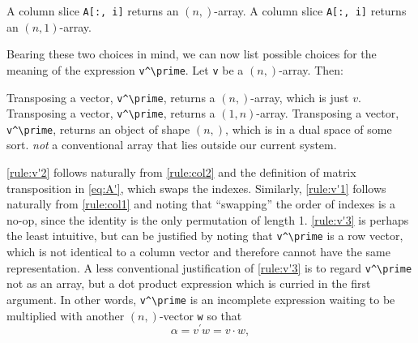 A column slice \lstinline|A[:, i]| returns an $(n,)$-array.\label{rule:col1}
A column slice \lstinline|A[:, i]| returns an $(n,1)$-array.\label{rule:col2}

Bearing these two choices in mind, we can now list possible choices for the
meaning of the expression \lstinline|v^\prime|. Let \lstinline|v| be a $(n,)$-array. Then:

Transposing a vector, \lstinline|v^\prime|, returns a $(n,)$-array, which is just
      $v$.\label{rule:v'1}
Transposing a vector, \lstinline|v^\prime|, returns a $(1,n)$-array.\label{rule:v'2}
Transposing a vector, \lstinline|v^\prime|, returns an object of shape $(n,)$,
      which is in a dual space of some sort. \textit{not} a conventional array
      that lies outside our current system.\label{rule:v'3}
%

\ref{rule:v'2} follows naturally from \ref{rule:col2} and the definition of
matrix transposition in \eqref{eq:A'}, which swaps the indexes. Similarly,
\ref{rule:v'1} follows naturally from \ref{rule:col1} and noting that
``swapping'' the order of indexes is a no-op, since the identity is the only
permutation of length 1. \ref{rule:v'3} is perhaps the least intuitive, but
can be justified by noting that \lstinline|v^\prime| is a row vector, which is not
identical to a column vector and therefore cannot have the same representation.
A less conventional justification of \ref{rule:v'3} is to regard \lstinline|v^\prime|
not as an array, but a dot product expression which is curried in the first
argument. In other words, \lstinline|v^\prime| is an incomplete expression waiting to
be multiplied with another $(n,)$-vector \lstinline|w| so that
%
\begin{equation}
	\alpha = v^\prime w = v \cdot w,\label{eq:w'v}
\end{equation}
%
%


